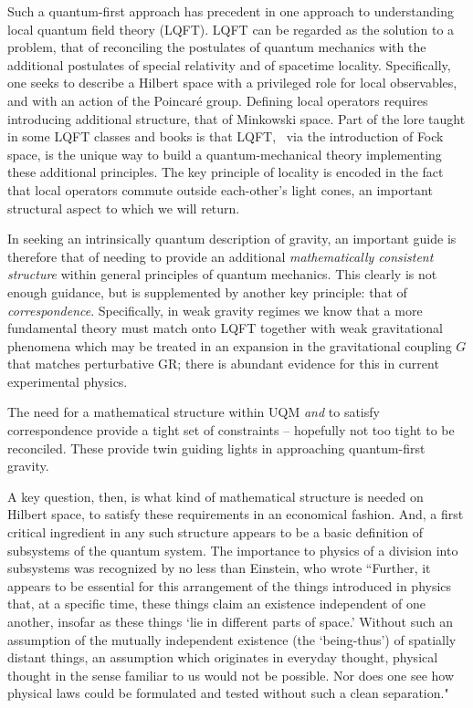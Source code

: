 Such a quantum-first approach has precedent in one approach to understanding local quantum field theory (LQFT).  LQFT can be regarded as the solution to a problem, that of reconciling the postulates of quantum mechanics with the additional  postulates of special relativity and of  spacetime locality.  Specifically, one seeks to describe a Hilbert space with a privileged role for local observables, and with an action of the Poincar\'e group.  Defining local operators requires introducing additional structure, that of Minkowski space.  Part of the lore taught in some LQFT classes and books is that LQFT, \eg\ via the introduction of Fock space, is the unique way to build a quantum-mechanical theory implementing these additional principles.  The key principle of locality is encoded in the fact that local operators commute outside each-other's light cones, an important structural aspect to which we will return.

In seeking an intrinsically quantum description of gravity, an important guide is therefore that of needing to provide an additional {\it mathematically consistent structure} within  general principles of quantum mechanics.  This clearly is not enough guidance, but is supplemented by another key principle: that of {\it correspondence}.  Specifically, in weak gravity regimes we know that a more fundamental theory must match onto LQFT together with weak gravitational phenomena which may be treated in an expansion in the gravitational coupling $G$ that matches perturbative GR; there is abundant evidence for this in current experimental physics.  

The need for a mathematical structure within UQM {\it and} to satisfy correspondence provide a tight set of constraints -- hopefully not too tight to be reconciled.  These provide twin guiding lights in approaching quantum-first gravity.  

A key question, then, is what kind of mathematical structure is needed on Hilbert space, to satisfy these requirements in an economical fashion.  And, a first critical ingredient in any such structure appears to be a basic definition of subsystems of the quantum system.  The importance to physics of a division into subsystems was recognized by no less than Einstein, who wrote  ``Further, it appears to be essential for this arrangement of the things introduced in physics that, at a specific time, these things claim an existence independent of one another, insofar as these things `lie in different parts of space.'  Without such an assumption of the mutually independent existence (the `being-thus') of spatially distant things, an assumption which originates in everyday thought, physical thought in the sense familiar to us would not be possible.  Nor does one see how physical laws could be formulated and tested without such a clean separation."  

